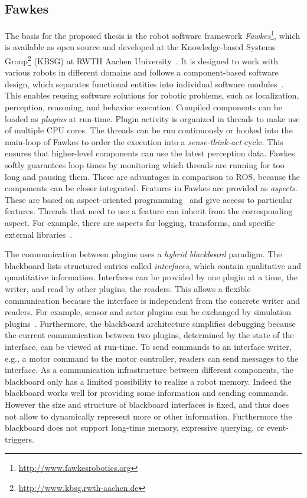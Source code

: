 \subsection{Fawkes}
\label{sec:fawkes}
The basis for the proposed thesis is the robot software framework
\emph{Fawkes}\footnote{\url{http://www.fawkesrobotics.org}}, which is
available as open source and developed at the Knowledge-based Systems
Group\footnote{\url{http://www.kbsg.rwth-aachen.de}} (KBSG) at RWTH
Aachen University~\cite{FawkesDesign,Fawkes-RCLL-2014}.  It is
designed to work with various robots in different domains and follows
a component-based software design, which separates functional entities
into individual software modules~\cite{component}. This enables
reusing software solutions for robotic problems, such as localization,
perception, reasoning, and behavior execution. Compiled components can
be loaded as \emph{plugins} at run-time.
%
Plugin activity is organized in threads to make use of multiple CPU
cores. The threads can be run continuously or hooked into the
main-loop of Fawkes to order the execution into a
\emph{sense-think-act} cycle.  This ensures that higher-level
components can use the latest perception data.  Fawkes softly
guarantees loop times by monitoring which threads are running for too
long and pausing them. These are advantages in comparison to ROS,
because the components can be closer integrated. Features in Fawkes
are provided as \emph{aspects}. These are based on aspect-oriented
programming~\cite{aspect_oriented} and give access to particular
features. Threads that need to use a feature can inherit from the
corresponding aspect. For example, there are aspects for logging,
transforms, and specific external libraries~\cite{tnthesis}.

The communication between plugins uses a \emph{hybrid blackboard}
paradigm. The blackboard lists structured entries called
\emph{interfaces}, which contain qualitative and quantitative
information.  Interfaces can be provided by one plugin at a time, the
writer, and read by other plugins, the readers. This allows a flexible
communication because the interface is independent from the concrete
writer and readers.  For example, sensor and actor plugins can be
exchanged by simulation plugins~\cite{Gazsim-Thesis,LLSF-Sim}.
Furthermore, the blackboard architecture simplifies
debugging because the current communication between two plugins,
determined by the state of the interface, can be viewed at
run-time. To send commands to an interface writer, e.g., a motor
command to the motor controller, readers can send messages to the
interface.
As a communication infrastructure between different components, the
blackboard only has a limited possibility to realize a robot memory.
Indeed the blackboard works well for providing some information and sending
commands. However the size
and structure of blackboard interfaces is fixed, and thus does not
allow to dynamically represent more or other information.  Furthermore
the blackboard does not support long-time memory, expressive querying,
or event-triggers.

